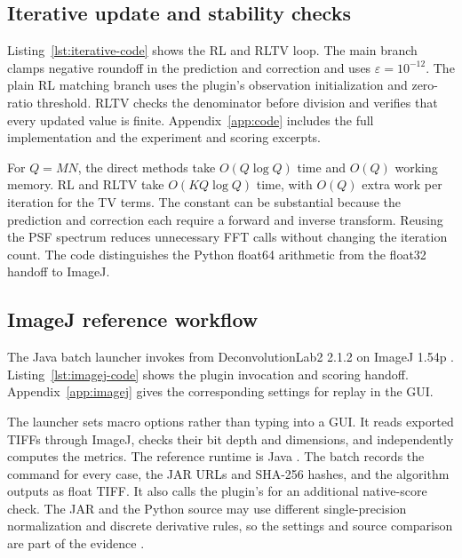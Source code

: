 
\subsection{Iterative update and stability checks}

Listing~\ref{lst:iterative-code} shows the RL and RLTV loop. The main branch clamps negative roundoff in the prediction and correction and uses \(\varepsilon=10^{-12}\). The plain RL matching branch uses the plugin's observation initialization and zero-ratio threshold. RLTV checks the denominator before division and verifies that every updated value is finite. Appendix~\ref{app:code} includes the full  implementation and the experiment and scoring excerpts.

For \(Q=MN\), the direct methods take \(O(Q\log Q)\) time and \(O(Q)\) working memory. RL and RLTV take \(O(KQ\log Q)\) time, with \(O(Q)\) extra work per iteration for the TV terms. The constant can be substantial because the prediction and correction each require a forward and inverse transform. Reusing the PSF spectrum reduces unnecessary FFT calls without changing the iteration count. The code distinguishes the Python float64 arithmetic from the float32 handoff to ImageJ.

\subsection{ImageJ reference workflow}

The Java batch launcher invokes  from DeconvolutionLab2 2.1.2 on ImageJ 1.54p \citep{sage,dl2docs}. Listing~\ref{lst:imagej-code} shows the plugin invocation and scoring handoff. Appendix~\ref{app:imagej} gives the corresponding settings for replay in the GUI.

The launcher sets macro options rather than typing into a GUI. It reads exported TIFFs through ImageJ, checks their bit depth and dimensions, and independently computes the metrics. The reference runtime is Java \JVMVersion. The batch records the command for every case, the JAR URLs and SHA-256 hashes, and the algorithm outputs as float TIFF. It also calls the plugin's  for an additional native-score check. The JAR and the Python source may use different single-precision normalization and discrete derivative rules, so the settings and source comparison are part of the evidence \citep{dl2code}.

